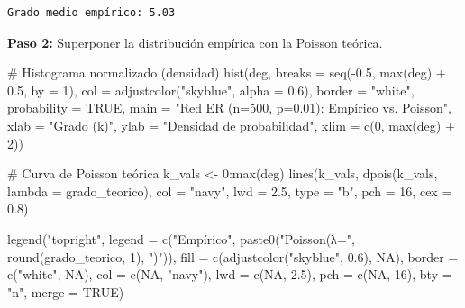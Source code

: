 \documentclass[
  letterpaper,
  DIV=11,
  numbers=noendperiod]{scrreprt}
\newenvironment{Shaded}{\begin{snugshade}}{\end{snugshade}}
\newcommand{\AttributeTok}[1]{\textcolor[rgb]{0.40,0.45,0.13}{#1}}
\newcommand{\CommentTok}[1]{\textcolor[rgb]{0.37,0.37,0.37}{#1}}
\newcommand{\ConstantTok}[1]{\textcolor[rgb]{0.56,0.35,0.01}{#1}}
\newcommand{\DecValTok}[1]{\textcolor[rgb]{0.68,0.00,0.00}{#1}}
\newcommand{\FloatTok}[1]{\textcolor[rgb]{0.68,0.00,0.00}{#1}}
\newcommand{\FunctionTok}[1]{\textcolor[rgb]{0.28,0.35,0.67}{#1}}
\newcommand{\NormalTok}[1]{\textcolor[rgb]{0.00,0.23,0.31}{#1}}
\newcommand{\OtherTok}[1]{\textcolor[rgb]{0.00,0.23,0.31}{#1}}
\newcommand{\SpecialCharTok}[1]{\textcolor[rgb]{0.37,0.37,0.37}{#1}}
\newcommand{\StringTok}[1]{\textcolor[rgb]{0.13,0.47,0.30}{#1}}
\begin{document}
\begin{tcolorbox}
\begin{verbatim}
Grado medio empírico: 5.03 
\end{verbatim}

\textbf{Paso 2:} Superponer la distribución empírica con la Poisson
teórica.

\begin{Shaded}
\begin{Highlighting}[]
\CommentTok{\# Histograma normalizado (densidad)}
\FunctionTok{hist}\NormalTok{(deg,}
     \AttributeTok{breaks =} \FunctionTok{seq}\NormalTok{(}\SpecialCharTok{{-}}\FloatTok{0.5}\NormalTok{, }\FunctionTok{max}\NormalTok{(deg) }\SpecialCharTok{+} \FloatTok{0.5}\NormalTok{, }\AttributeTok{by =} \DecValTok{1}\NormalTok{),}
     \AttributeTok{col =} \FunctionTok{adjustcolor}\NormalTok{(}\StringTok{"skyblue"}\NormalTok{, }\AttributeTok{alpha =} \FloatTok{0.6}\NormalTok{), }\AttributeTok{border =} \StringTok{"white"}\NormalTok{,}
     \AttributeTok{probability =} \ConstantTok{TRUE}\NormalTok{,}
     \AttributeTok{main =} \StringTok{"Red ER (n=500, p=0.01): Empírico vs. Poisson"}\NormalTok{,}
     \AttributeTok{xlab =} \StringTok{"Grado (k)"}\NormalTok{, }\AttributeTok{ylab =} \StringTok{"Densidad de probabilidad"}\NormalTok{,}
     \AttributeTok{xlim =} \FunctionTok{c}\NormalTok{(}\DecValTok{0}\NormalTok{, }\FunctionTok{max}\NormalTok{(deg) }\SpecialCharTok{+} \DecValTok{2}\NormalTok{))}

\CommentTok{\# Curva de Poisson teórica}
\NormalTok{k\_vals }\OtherTok{\textless{}{-}} \DecValTok{0}\SpecialCharTok{:}\FunctionTok{max}\NormalTok{(deg)}
\FunctionTok{lines}\NormalTok{(k\_vals, }\FunctionTok{dpois}\NormalTok{(k\_vals, }\AttributeTok{lambda =}\NormalTok{ grado\_teorico), }
      \AttributeTok{col =} \StringTok{"navy"}\NormalTok{, }\AttributeTok{lwd =} \FloatTok{2.5}\NormalTok{, }\AttributeTok{type =} \StringTok{"b"}\NormalTok{, }\AttributeTok{pch =} \DecValTok{16}\NormalTok{, }\AttributeTok{cex =} \FloatTok{0.8}\NormalTok{)}

\FunctionTok{legend}\NormalTok{(}\StringTok{"topright"}\NormalTok{, }
       \AttributeTok{legend =} \FunctionTok{c}\NormalTok{(}\StringTok{"Empírico"}\NormalTok{, }\FunctionTok{paste0}\NormalTok{(}\StringTok{"Poisson(λ="}\NormalTok{, }\FunctionTok{round}\NormalTok{(grado\_teorico, }\DecValTok{1}\NormalTok{), }\StringTok{")"}\NormalTok{)),}
       \AttributeTok{fill =} \FunctionTok{c}\NormalTok{(}\FunctionTok{adjustcolor}\NormalTok{(}\StringTok{"skyblue"}\NormalTok{, }\FloatTok{0.6}\NormalTok{), }\ConstantTok{NA}\NormalTok{),}
       \AttributeTok{border =} \FunctionTok{c}\NormalTok{(}\StringTok{"white"}\NormalTok{, }\ConstantTok{NA}\NormalTok{),}
       \AttributeTok{col =} \FunctionTok{c}\NormalTok{(}\ConstantTok{NA}\NormalTok{, }\StringTok{"navy"}\NormalTok{), }\AttributeTok{lwd =} \FunctionTok{c}\NormalTok{(}\ConstantTok{NA}\NormalTok{, }\FloatTok{2.5}\NormalTok{), }\AttributeTok{pch =} \FunctionTok{c}\NormalTok{(}\ConstantTok{NA}\NormalTok{, }\DecValTok{16}\NormalTok{),}
       \AttributeTok{bty =} \StringTok{"n"}\NormalTok{, }\AttributeTok{merge =} \ConstantTok{TRUE}\NormalTok{)}
\end{Highlighting}
\end{Shaded}


\end{tcolorbox}
\end{document}
